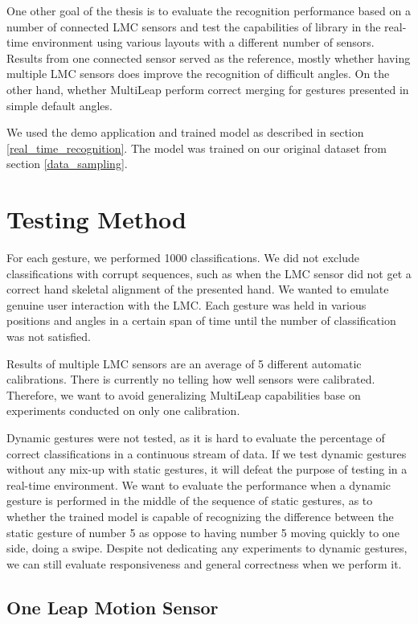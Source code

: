 
One other goal of the thesis is to evaluate the recognition performance based on a number of connected LMC sensors and test the capabilities of  library in the real-time environment using various layouts with a different number of sensors. Results from one connected sensor served as the reference, mostly whether having multiple LMC sensors does improve the recognition of difficult angles. On the other hand, whether MultiLeap \cite{tomasMultileap} perform correct merging for gestures presented in simple default angles.

We used the demo application and trained model as described in section \ref{real_time_recognition}. The model was trained on our original dataset from section \ref{data_sampling}. 

\section{Testing Method}

For each gesture, we performed 1000 classifications. We did not exclude classifications with corrupt sequences, such as when the LMC sensor did not get a correct hand skeletal alignment of the presented hand. We wanted to emulate genuine user interaction with the LMC. Each gesture was held in various positions and angles in a certain span of time until the number of classification was not satisfied. 

Results of multiple LMC sensors are an average of 5 different automatic calibrations. There is currently no telling how well sensors were calibrated. Therefore, we want to avoid generalizing MultiLeap capabilities base on experiments conducted on only one calibration.

Dynamic gestures were not tested, as it is hard to evaluate the percentage of correct classifications in a continuous stream of data. If we test dynamic gestures without any mix-up with static gestures, it will defeat the purpose of testing in a real-time environment. We want to evaluate the performance when a dynamic gesture is performed in the middle of the sequence of static gestures, as to whether the trained model is capable of recognizing the difference between the static gesture of number 5 as oppose to having number 5 moving quickly to one side, doing a swipe. Despite not dedicating any experiments to dynamic gestures, we can still evaluate responsiveness and general correctness when we perform it.


\subsection{One Leap Motion Sensor}

